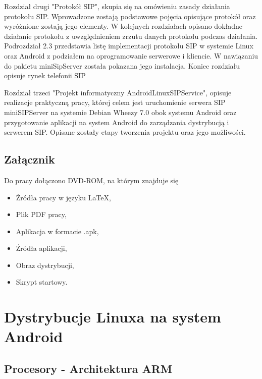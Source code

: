 Rozdział drugi "Protokół SIP", skupia się na omówieniu zasady działania protokołu SIP. Wprowadzone zostają podstawowe pojęcia opisujące protokół oraz wyróżnione zostają jego elementy. W kolejnych rozdziałach opisano dokładne działanie protokołu z uwzględnieniem zrzutu danych protokołu podczas działania. Podrozdział 2.3 przedstawia listę implementacji protokołu SIP w systemie Linux  oraz Android z podziałem na oprogramowanie serwerowe i kliencie. W nawiązaniu do pakietu miniSipServer została pokazana jego instalacja. Koniec rozdziału opisuje rynek telefonii SIP


Rozdział trzeci "Projekt informatyczny AndroidLinuxSIPService", opisuje realizacje praktyczną pracy, której celem jest uruchomienie serwera SIP miniSIPServer na systemie Debian Wheezy 7.0 obok systemu Android oraz przygotowanie aplikacji na system Android do zarządzania dystrybucją i serwerem SIP. Opisane zostały etapy tworzenia projektu oraz jego możliwości. 

\section{Załącznik}

Do pracy dołączono DVD-ROM, na którym znajduje się
\begin{itemize}
	\item Źródła pracy w języku LaTeX,
	\item Plik PDF pracy,
	\item Aplikacja w formacie .apk,
	\item Źródła aplikacji,
	\item Obraz dystrybucji,
	\item Skrypt startowy.
	
\end{itemize}

\chapter{Dystrybucje Linuxa na system Android} 


\section{Procesory - Architektura ARM}

